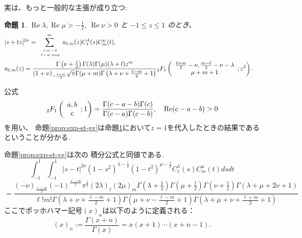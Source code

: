 \documentclass[12pt]{article} %
\newtheorem{prop}{命題}
\theoremstyle{remark}
\newcommand{\tmop}[1]{\ensuremath{\operatorname{#1}}}
\newenvironment{taggedprop}[1]
 {\renewcommand\thetaggedpropx{#1}\taggedpropx}
  {\endtaggedpropx}
\begin{document}
	実は、もっと一般的な主張が成り立つ:
	\begin{prop}\label{prop:exp-stz-gg}
		  \label{thm:4}$\tmop{Re} \lambda, \tmop{Re} \mu > - \frac{1}{2}$,
		    $\tmop{Re} \nu > 0$ と $-1 \leqslant z \leqslant 1$ のとき、
		      \begin{eqnarray}
			      & | s + t z |^{2 \nu}  = \sum_{\scalebox{0.6}{
				      $\begin{array}[]{c}
						  \ell,m=0\\\ell+ m\mbox{ :even}
					  \end{array}
				  $}}^{\infty} a_{\ell, m}
					          (z) C_\ell^{\lambda} (s) C_m^{\mu} (t), &  \nonumber\\
						      & a_{\ell, m} (z) = \frac{\Gamma \left( \nu + \frac{1}{2} \right) \Gamma
						      (\lambda) \Gamma (\mu) (\lambda + l) z^m }{(1 + \nu)_{- \frac{\ell + m}{2}} \sqrt{\pi} \Gamma
										      (\mu + m) \Gamma \left( \lambda + \nu + \frac{\ell - m}{2} + 1 \right)}
										    {}_2 F_1 \left( \begin{array}{c}
								        \frac{\ell + m}{2} - \nu, \frac{m - \ell}{2} - \nu - \lambda\\
									      \mu + m + 1
									          \end{array} ; z^2 \right). & 
										          \nonumber
											    \end{eqnarray}
    \end{prop}
    公式
\begin{equation*}
		{}_2F_1\left( \begin{array}[]{c}
			a,b\\c
		\end{array};1\right)=\frac{\Gamma(c-a-b)\Gamma(c)}{\Gamma(c-a)\Gamma(c-b)},\quad \Re(c-a-b)>0
	\end{equation*}
    を用い、
    命題\ref{prop:exp-st-gg}は命題\ref{prop:exp-stz-gg}において$z=1$を代入したときの結果であるということが分かる.

	命題\ref{prop:exp-st-gg}は次の
	積分公式と同値である.
	\begin{taggedprop}{$\;\mathbf{1'}$}
		\label{prop:int-st-gg}
		\begin{equation*}
			\int_{- 1}^1 \int_{- 1}^1 | s - t |^{2 \nu} (1 - s^2)^{\lambda - \frac{1}{2}}
			(1 - t^2)^{\mu - \frac{1}{2}} C_\ell^{\lambda} (s) C_m^{\mu} (t) d s d t
		\end{equation*}
		{
		\begin{equation}
			=\frac{(- \nu)_{\frac{\ell + m}{2}} (- 1)^{\frac{\ell - m}{2}} \pi^{\frac{1}{2}} (2
			\lambda)_\ell (2 \mu)_m \Gamma \left( \lambda + \frac{1}{2} \right) \Gamma \left(
			\mu + \frac{1}{2} \right) \Gamma \left( \nu + \frac{1}{2} \right) \Gamma
		(\lambda + \mu + 2 \nu + 1)}{\ell!m! \Gamma \left( \lambda + \nu + \frac{\ell -
		m}{2} + 1 \right) \Gamma \left( \mu + \nu - \frac{\ell - m}{2} + 1 \right) \Gamma
		\left( \lambda + \mu + \nu + \frac{\ell + m}{2} + 1 \right)}
			\label{eqn:int-st-gg}
			\tag{1$'$}
		\end{equation}
		}
	\end{taggedprop}
	ここでポッホハマー記号$(x)_n$は以下のように定義される：\begin{equation*}
		(x)_n:=\frac{\Gamma(x+n)}{\Gamma(x)}=x(x+1)\cdots(x+n-1).
	\end{equation*}
\end{document}
